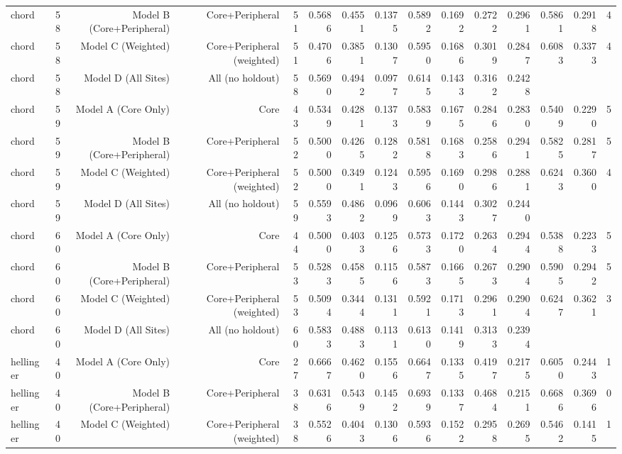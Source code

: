 {\begin{longtable}{lrrrrrrrrrrrrrr}
  chord & 58 & Model B (Core+Peripheral) & Core+Peripheral & 51 & 0.5686 & 0.4551 & 0.1375 & 0.5892 & 0.1692 & 0.2722 & 0.2961 & 0.5861 & 0.2918 & 4 \\
  chord & 58 & Model C (Weighted) & Core+Peripheral (weighted) & 51 & 0.4706 & 0.3851 & 0.1307 & 0.5950 & 0.1686 & 0.3019 & 0.2847 & 0.6083 & 0.3373 & 4 \\
  chord & 58 & Model D (All Sites) & All (no holdout) & 58 & 0.5690 & 0.4942 & 0.0977 & 0.6145 & 0.1433 & 0.3162 & 0.2428 &  &  &  \\
  chord & 59 & Model A (Core Only) & Core & 43 & 0.5349 & 0.4281 & 0.1373 & 0.5839 & 0.1675 & 0.2846 & 0.2830 & 0.5409 & 0.2290 & 5 \\
  chord & 59 & Model B (Core+Peripheral) & Core+Peripheral & 52 & 0.5000 & 0.4265 & 0.1282 & 0.5818 & 0.1683 & 0.2586 & 0.2941 & 0.5825 & 0.2817 & 5 \\
  chord & 59 & Model C (Weighted) & Core+Peripheral (weighted) & 52 & 0.5000 & 0.3491 & 0.1243 & 0.5956 & 0.1690 & 0.2986 & 0.2881 & 0.6243 & 0.3600 & 4 \\
  chord & 59 & Model D (All Sites) & All (no holdout) & 59 & 0.5593 & 0.4862 & 0.0969 & 0.6063 & 0.1443 & 0.3027 & 0.2440 &  &  &  \\
  chord & 60 & Model A (Core Only) & Core & 44 & 0.5000 & 0.4033 & 0.1256 & 0.5733 & 0.1720 & 0.2634 & 0.2944 & 0.5388 & 0.2233 & 5 \\
  chord & 60 & Model B (Core+Peripheral) & Core+Peripheral & 53 & 0.5283 & 0.4585 & 0.1156 & 0.5873 & 0.1665 & 0.2673 & 0.2904 & 0.5905 & 0.2942 & 5 \\
  chord & 60 & Model C (Weighted) & Core+Peripheral (weighted) & 53 & 0.5094 & 0.3444 & 0.1311 & 0.5921 & 0.1713 & 0.2961 & 0.2904 & 0.6247 & 0.3621 & 3 \\
  chord & 60 & Model D (All Sites) & All (no holdout) & 60 & 0.5833 & 0.4883 & 0.1131 & 0.6130 & 0.1419 & 0.3133 & 0.2394 &  &  &  \\
  hellinger & 40 & Model A (Core Only) & Core & 27 & 0.6667 & 0.4620 & 0.1556 & 0.6647 & 0.1335 & 0.4197 & 0.2175 & 0.6050 & 0.2443 & 1 \\
  hellinger & 40 & Model B (Core+Peripheral) & Core+Peripheral & 38 & 0.6316 & 0.5439 & 0.1452 & 0.6939 & 0.1337 & 0.4684 & 0.2151 & 0.6686 & 0.3696 & 0 \\
  hellinger & 40 & Model C (Weighted) & Core+Peripheral (weighted) & 38 & 0.5526 & 0.4043 & 0.1306 & 0.5936 & 0.1522 & 0.2958 & 0.2695 & 0.5462 & 0.1415 & 1 \\

\end{longtable}}
